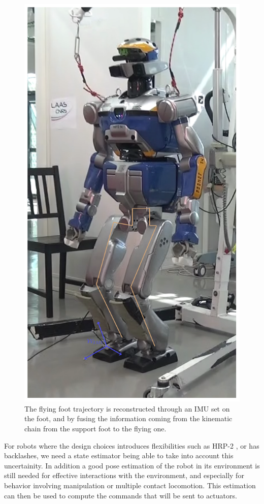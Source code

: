 \begin{figure}
\centering
\includegraphics[width=0.5\linewidth]{./figures/cover-figure.pdf}
	\caption{The flying foot trajectory is reconstructed through an IMU set on the foot, and by fusing the information coming from the kinematic chain
        from the support foot to the flying one.}
	\label{fig:cover}
\end{figure}

For robots where the design choices introduces flexibilities such as HRP-2 \cite{Nakaoka:iros:2007}, or has backlashes,
we need a state estimator being able to take into account this uncertainity.
In addition a good pose estimation of the robot in its environment is still needed for effective interactions with the environment,
and especially for behavior involving manipulation or multiple contact locomotion.
This estimation can then be used to compute the commands that will be sent to actuators.
%
%

